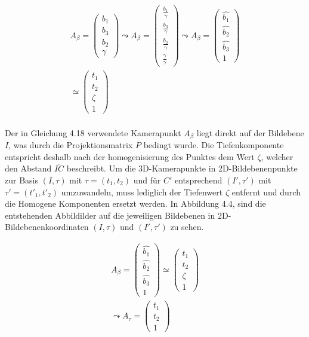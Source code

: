 \begin{gather}
A_\beta = 
\begin{pmatrix}
b_1\\b_3\\ b_2\\\gamma
\end{pmatrix}
\leadsto A_\beta= 
\begin{pmatrix}
\frac{b_1}{\gamma}\\ \frac{b_3}{\gamma}\\ \frac{b_2}{\gamma}\\ \frac{\gamma}{\gamma}
\end{pmatrix}
\leadsto A_\beta =
\begin{pmatrix}
\hat{b_1}\\
\hat{b_2}\\
\hat{b_3}\\
1
\end{pmatrix}\\
\simeq
\begin{pmatrix}
t_1\\
t_2\\
\zeta\\
1
\end{pmatrix}
\end{gather}\\

Der in Gleichung 4.18 verwendete Kamerapunkt $A_\beta$ liegt direkt auf der Bildebene $I$, was durch die Projektionsmatrix $P$ bedingt wurde. Die Tiefenkomponente entspricht deshalb nach der homogenisierung des Punktes dem Wert $\zeta$, welcher den Abstand $\overline{IC}$ beschreibt. Um die 3D-Kamerapunkte in 2D-Bildebenenpunkte zur Basis $(I,\tau)$ mit $\tau = (t_1,t_2)$ und für $C'$ entsprechend $(I',\tau')$ mit $\tau' = (t'_1,t'_2)$ umzuwandeln, muss lediglich der Tiefenwert $\zeta$ entfernt und durch die Homogene Komponenten ersetzt werden. In Abbildung 4.4, sind die entstehenden Abbildilder auf die jeweiligen Bildebenen in 2D-Bildebenenkoordinaten $(I,\tau)$ und $(I',\tau')$ zu sehen.

\begin{gather}
	 A_\beta =
	\begin{pmatrix}
	\hat{b_1}\\
	\hat{b_2}\\
	\hat{b_3}\\
	1
	\end{pmatrix}
	\simeq
	\begin{pmatrix}
	t_1\\
	t_2\\
	\zeta\\
	1
	\end{pmatrix}\\
	\leadsto A_\tau = 
	\begin{pmatrix}
	t_1\\
	t_2\\
	1
	\end{pmatrix}\\
\end{gather}



